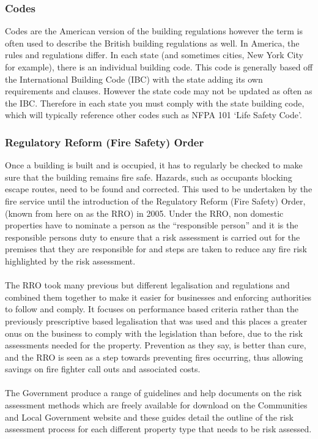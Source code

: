 \documentclass[table,a4paper,oneside]{book}
\begin{document}
\subsubsection{Codes}
Codes are the American version of the building regulations however the term is often used to describe the British building regulations as well. In America, the rules and regulations differ. In each state (and sometimes cities,  New York City for example), there is an individual building code. This code is generally based off the International Building Code (IBC) with the state adding its own requirements and clauses. However the state code may not be updated as often as the IBC. Therefore in each state you must comply with the state building code, which will typically reference other codes such as NFPA 101 `Life Safety Code'.
\subsubsection{Regulatory Reform (Fire Safety) Order}
Once a building is built and is occupied, it has to regularly be checked to make sure that the building remains fire safe.  Hazards, such as occupants blocking escape routes, need to be found and corrected. This used to be undertaken by the fire service until the introduction of the Regulatory Reform (Fire Safety) Order, (known from here on as the RRO) in 2005.
Under the RRO, non domestic properties have to nominate a person as the ``responsible person'' and it is the responsible persons duty to ensure that a risk assessment is carried out for the premises that they are responsible for and steps are taken to reduce any fire risk highlighted by the risk assessment.
\\
\\
The RRO took many previous but different legalisation and regulations and combined them together to make it easier for businesses and enforcing authorities to follow and comply. It focuses on performance based criteria rather than the previously prescriptive based legalisation that was used and this places a greater onus on the business to comply with the legislation than before, due to the risk assessments needed for the property.
Prevention as they say, is better than cure, and the RRO is seen as a step towards preventing fires occurring, thus allowing savings on fire fighter call outs and associated costs.
\\
\\
The Government produce a range of guidelines and help documents on the risk assessment methods which are freely available for download on the Communities and Local Government website and these guides detail the outline of the risk assessment process for each different property type that needs to be risk assessed.
\end{document}

